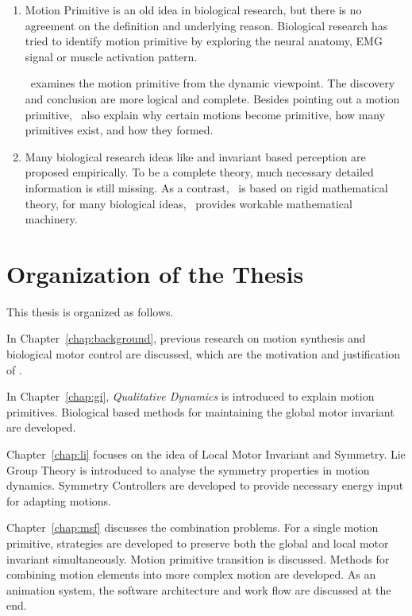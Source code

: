\begin{enumerate}
\item 
Motion Primitive is an old idea in biological research, but there is no agreement on the definition and underlying reason.
Biological research has tried to identify motion primitive by exploring the neural anatomy, EMG signal or muscle activation pattern.

{\moit}\ examines the motion primitive from the dynamic viewpoint.
The discovery and conclusion are more logical and complete.
Besides pointing out a motion primitive, {\moit}\ also explain why certain motions become primitive, how many primitives exist, and how they formed.


\item Many biological research ideas like \cpg and invariant based perception are proposed empirically. 
To be a complete theory, much necessary detailed information is still missing.
As a contrast, {\moit}\ is based on rigid mathematical theory, for many biological ideas, {\moit}\ provides workable mathematical machinery.

\end{enumerate}







\section{Organization of the Thesis}

This thesis is organized as follows.
 
In Chapter~\ref{chap:background}, previous research on motion synthesis and biological motor control are discussed, which are the motivation and justification of {\moit}.
 
In Chapter~\ref{chap:gi}, \emph{Qualitative Dynamics} is introduced to explain motion primitives. 
Biological based  methods for maintaining the global motor invariant are developed.

Chapter~\ref{chap:li} focuses on the idea of Local Motor Invariant and Symmetry.
Lie Group Theory is  introduced  to analyse the symmetry properties in motion dynamics.
Symmetry Controllers are developed to provide necessary energy input for adapting motions.
 


Chapter~\ref{chap:msf} discusses the combination problems.
For a single motion primitive,  strategies are developed to preserve both the global and local motor invariant simultaneously.
Motion primitive transition is discussed.
Methods for combining motion elements into more complex motion are developed.
As an animation system, the software architecture and work flow are discussed at the end.

